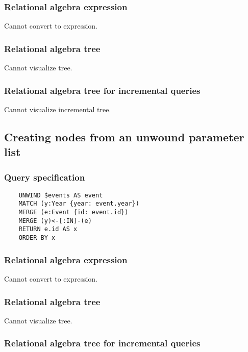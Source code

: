 	\subsubsection*{Relational algebra expression}

	Cannot convert to expression.

	\subsubsection*{Relational algebra tree}

	Cannot visualize tree.

	\subsubsection*{Relational algebra tree for incremental queries}

	Cannot visualize incremental tree.
	\subsection{Creating nodes from an unwound parameter list}

	\subsubsection*{Query specification}

	\begin{lstlisting}
	UNWIND $events AS event
	MATCH (y:Year {year: event.year})
	MERGE (e:Event {id: event.id})
	MERGE (y)<-[:IN]-(e)
	RETURN e.id AS x
	ORDER BY x
	\end{lstlisting}


	\subsubsection*{Relational algebra expression}

	Cannot convert to expression.

	\subsubsection*{Relational algebra tree}

	Cannot visualize tree.

	\subsubsection*{Relational algebra tree for incremental queries}

